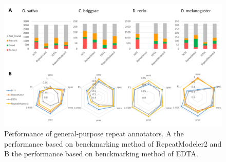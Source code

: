 \documentclass{bmcart}
\begin{document}
\begin{figure}[h!]
	\centerline{\includegraphics[width=1.0\textwidth]{figures/TotalResults.pdf}}
	\caption{Performance of general-purpose repeat annotators. A the performance based on benckmarking method of RepeatModeler2 and B the performance based on benckmarking method of EDTA.}
	\label{fig:total_results}
\end{figure}

\begin{table}[h!]
	\caption{TE content in the D. rerio (Danio rerio ``assembly GRCz11") genome.}\label{d.rerio_repbase}
\end{table}
\end{document}
